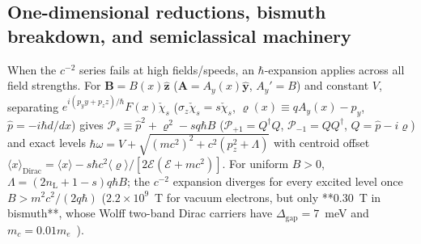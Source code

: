 \documentclass[aps,prd,onecolumn,tightenlines,nofootinbib,notitlepage,10pt,floatfix]{revtex4-2}
\theoremstyle{indentedtheorem}
\begin{document}
\subsection{One-dimensional reductions, bismuth breakdown, and semiclassical machinery}
\label{sec:bs_theorems}

When the $c^{-2}$ series fails at high fields/speeds, an $\hbar$-expansion applies across all field strengths. For $\mathbf{B}=B(x)\hat{\mathbf{z}}$ ($\mathbf{A}=A_y(x)\hat{\mathbf{y}}$, $A_y'=B$) and constant $V$, separating $e^{i(p_y y+p_z z)/\hbar}F(x)\check{\chi}_s$ ($\sigma_z\check{\chi}_s=s\check{\chi}_s$, $\varrho(x)\equiv qA_y(x)-p_y$, $\hat{p}=-i\hbar d/dx$) gives $\mathcal{P}_s\equiv\hat{p}^2+\varrho^2-sq\hbar B$ ($\mathcal{P}_{+1}=Q^\dagger Q$, $\mathcal{P}_{-1}=QQ^\dagger$, $Q=\hat{p}-i\varrho$) and exact levels $\hbar\omega=V+\sqrt{(mc^2)^2+c^2(p_z^2+\Lambda)}$ with centroid offset $\langle x\rangle_\text{Dirac}=\langle x\rangle-s\hbar c^2\langle\varrho\rangle/[2\mathcal{E}(\mathcal{E}+mc^2)]$. For uniform $B>0$, $\Lambda=(2n_\text{L}+1-s)q\hbar B$; the $c^{-2}$ expansion diverges for every excited level once $B>m^2 c^2/(2q\hbar)$ ($2.2\times 10^9$~T for vacuum electrons, but only **$0.30$~T in bismuth**, whose Wolff two-band Dirac carriers have $\Delta_\text{gap}=7$~meV and $m_c=0.01 m_e$~\citep{Wolff1964Matrix,Fuseya2015Transport}).
\end{document}
